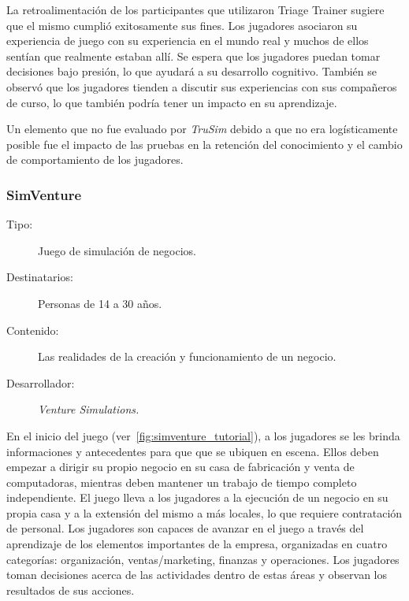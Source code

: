 La retroalimentación de los participantes que utilizaron Triage Trainer sugiere
que el mismo cumplió exitosamente sus fines. Los jugadores asociaron su
experiencia de juego con su experiencia en el mundo real y muchos de ellos
sentían que realmente estaban allí. Se espera que los jugadores puedan tomar
decisiones bajo presión, lo que ayudará a su desarrollo cognitivo. También se
observó que los jugadores tienden a discutir sus experiencias con sus compañeros
de curso, lo que también podría tener un impacto en su aprendizaje.

Un elemento que no fue evaluado por \emph{TruSim} debido a que no era
logísticamente posible fue el impacto de las pruebas en la retención del
conocimiento y el cambio de comportamiento de los
jugadores\cite{education:games}. 


\subsubsection{SimVenture}

\begin{description}
\item[Tipo:] Juego de simulación de negocios.
\item[Destinatarios:] Personas de 14 a 30 años.
\item[Contenido:] Las realidades de la creación y funcionamiento de un negocio.
\item[Desarrollador:] \emph{Venture Simulations.}
\end{description}

En el inicio del juego (ver~\ref{fig:simventure_tutorial}), a los jugadores se
les brinda informaciones y antecedentes para que que se ubiquen en escena. Ellos
deben empezar a dirigir su propio negocio en su casa de fabricación y venta de
computadoras, mientras deben mantener un trabajo de tiempo completo
independiente. El juego lleva a los jugadores a la ejecución de un negocio en su
propia casa y a la extensión del mismo a más locales, lo que requiere
contratación de personal. Los jugadores son capaces de avanzar en el juego a
través del aprendizaje de los elementos importantes de la empresa, organizadas
en cuatro categorías: organización, ventas/marketing, finanzas y operaciones.
Los jugadores toman decisiones acerca de las actividades dentro de estas áreas y
observan los resultados de sus acciones. 

